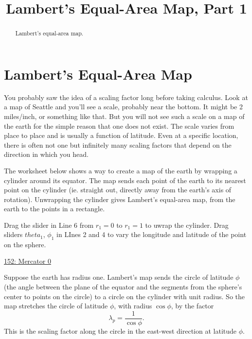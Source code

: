 \documentclass{ximera}
\title{Lambert's Equal-Area Map, Part 1}
\begin{document}
\begin{abstract}
Lambert's equal-area map.
\end{abstract}
\maketitle


\section{Lambert's Equal-Area Map}


You probably saw the idea of a scaling factor long before taking calculus. Look at a map of Seattle and you'll see a scale, probably near the bottom. It might be 2 miles/inch, or something like that. But you will not see such a scale on a map of the earth for the simple reason that one does not exist. The scale varies from place to place and is usually a function of latitude. Even at a specific location, there is often not one but infinitely many scaling factors that depend on the direction in which you head. 

The worksheet below shows a way to create a map of the earth by wrapping a cylinder around its equator. The map sends each point of the earth to its nearest point on the cylinder (ie. straight out, directly away from the earth's axis of rotation). Unwrapping the cylinder gives Lambert's equal-area map, from the earth to the points in a rectangle.

\begin{exploration}  \label{EdDkjkeFERerRd8}
Drag the slider in Line 6  from $r_1=0$ to $r_1=1$ to uwrap the cylinder. Drag sliders $theta_1$, $\phi_1$ in LInes 2 and 4 to vary the longitude and latitude of the point on the sphere.
\begin{onlineOnly}
    \begin{center}
\end{center}
\end{onlineOnly}

\href{https://www.desmos.com/3d/ehyvvttdeo}{152: Mercator 0}

\end{exploration}

Suppose the earth has radius one. Lambert's map sends the circle of latitude $\phi$ (the angle between the plane of the equator and the segments from the sphere's center to points on the circle) to a circle on the cylinder with unit radius. So the map stretches the circle of latitude $\phi$, with radius $\cos\phi$, by the factor
\[
 \lambda_p = \frac{1}{\cos\phi}.
\]
This is the scaling factor along the circle in the east-west direction at latitude $\phi$.
\end{document}
